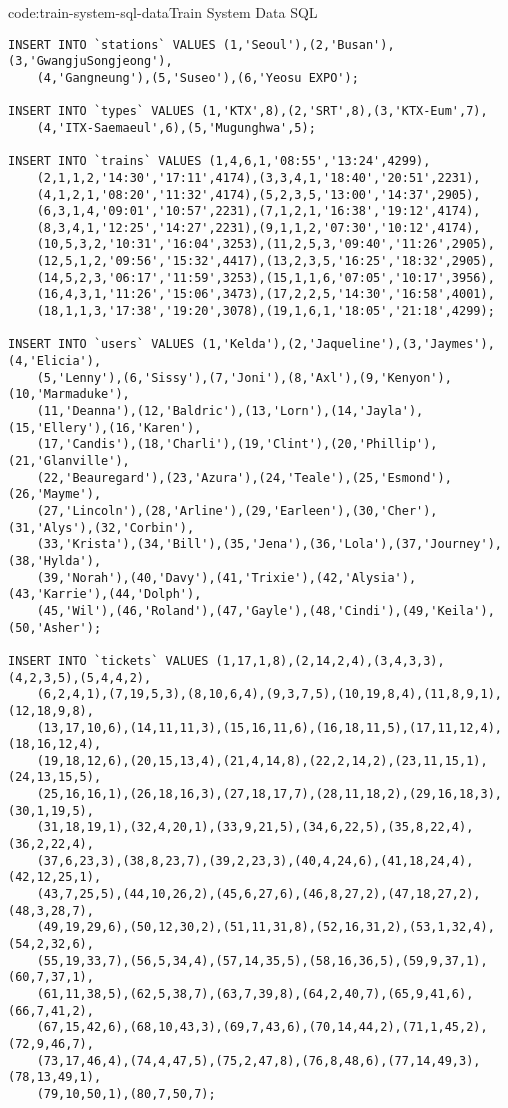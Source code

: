 \begin{codeenv}{code:train-system-sql-data}{Train System Data SQL}
\begin{verbatim}
INSERT INTO `stations` VALUES (1,'Seoul'),(2,'Busan'),(3,'GwangjuSongjeong'),
    (4,'Gangneung'),(5,'Suseo'),(6,'Yeosu EXPO');

INSERT INTO `types` VALUES (1,'KTX',8),(2,'SRT',8),(3,'KTX-Eum',7),
    (4,'ITX-Saemaeul',6),(5,'Mugunghwa',5);

INSERT INTO `trains` VALUES (1,4,6,1,'08:55','13:24',4299),
    (2,1,1,2,'14:30','17:11',4174),(3,3,4,1,'18:40','20:51',2231),
    (4,1,2,1,'08:20','11:32',4174),(5,2,3,5,'13:00','14:37',2905),
    (6,3,1,4,'09:01','10:57',2231),(7,1,2,1,'16:38','19:12',4174),
    (8,3,4,1,'12:25','14:27',2231),(9,1,1,2,'07:30','10:12',4174),
    (10,5,3,2,'10:31','16:04',3253),(11,2,5,3,'09:40','11:26',2905),
    (12,5,1,2,'09:56','15:32',4417),(13,2,3,5,'16:25','18:32',2905),
    (14,5,2,3,'06:17','11:59',3253),(15,1,1,6,'07:05','10:17',3956),
    (16,4,3,1,'11:26','15:06',3473),(17,2,2,5,'14:30','16:58',4001),
    (18,1,1,3,'17:38','19:20',3078),(19,1,6,1,'18:05','21:18',4299);

INSERT INTO `users` VALUES (1,'Kelda'),(2,'Jaqueline'),(3,'Jaymes'),(4,'Elicia'),
    (5,'Lenny'),(6,'Sissy'),(7,'Joni'),(8,'Axl'),(9,'Kenyon'),(10,'Marmaduke'),
    (11,'Deanna'),(12,'Baldric'),(13,'Lorn'),(14,'Jayla'),(15,'Ellery'),(16,'Karen'),
    (17,'Candis'),(18,'Charli'),(19,'Clint'),(20,'Phillip'),(21,'Glanville'),
    (22,'Beauregard'),(23,'Azura'),(24,'Teale'),(25,'Esmond'),(26,'Mayme'),
    (27,'Lincoln'),(28,'Arline'),(29,'Earleen'),(30,'Cher'),(31,'Alys'),(32,'Corbin'),
    (33,'Krista'),(34,'Bill'),(35,'Jena'),(36,'Lola'),(37,'Journey'),(38,'Hylda'),
    (39,'Norah'),(40,'Davy'),(41,'Trixie'),(42,'Alysia'),(43,'Karrie'),(44,'Dolph'),
    (45,'Wil'),(46,'Roland'),(47,'Gayle'),(48,'Cindi'),(49,'Keila'),(50,'Asher');

INSERT INTO `tickets` VALUES (1,17,1,8),(2,14,2,4),(3,4,3,3),(4,2,3,5),(5,4,4,2),
    (6,2,4,1),(7,19,5,3),(8,10,6,4),(9,3,7,5),(10,19,8,4),(11,8,9,1),(12,18,9,8),
    (13,17,10,6),(14,11,11,3),(15,16,11,6),(16,18,11,5),(17,11,12,4),(18,16,12,4),
    (19,18,12,6),(20,15,13,4),(21,4,14,8),(22,2,14,2),(23,11,15,1),(24,13,15,5),
    (25,16,16,1),(26,18,16,3),(27,18,17,7),(28,11,18,2),(29,16,18,3),(30,1,19,5),
    (31,18,19,1),(32,4,20,1),(33,9,21,5),(34,6,22,5),(35,8,22,4),(36,2,22,4),
    (37,6,23,3),(38,8,23,7),(39,2,23,3),(40,4,24,6),(41,18,24,4),(42,12,25,1),
    (43,7,25,5),(44,10,26,2),(45,6,27,6),(46,8,27,2),(47,18,27,2),(48,3,28,7),
    (49,19,29,6),(50,12,30,2),(51,11,31,8),(52,16,31,2),(53,1,32,4),(54,2,32,6),
    (55,19,33,7),(56,5,34,4),(57,14,35,5),(58,16,36,5),(59,9,37,1),(60,7,37,1),
    (61,11,38,5),(62,5,38,7),(63,7,39,8),(64,2,40,7),(65,9,41,6),(66,7,41,2),
    (67,15,42,6),(68,10,43,3),(69,7,43,6),(70,14,44,2),(71,1,45,2),(72,9,46,7),
    (73,17,46,4),(74,4,47,5),(75,2,47,8),(76,8,48,6),(77,14,49,3),(78,13,49,1),
    (79,10,50,1),(80,7,50,7);
\end{verbatim}
\end{codeenv}
